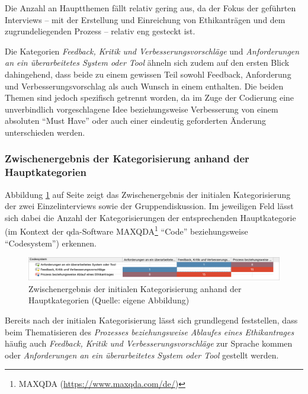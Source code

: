 \documentclass[a4paper,12pt,twoside]{scrreprt}
\begin{document}
Die Anzahl an Hauptthemen fällt relativ gering aus, da der Fokus der geführten Interviews -- mit der Erstellung und Einreichung von Ethikanträgen und dem zugrundeliegenden Prozess -- relativ eng gesteckt ist.

Die Kategorien \textit{Feedback, Kritik und Verbesserungsvorschläge} und \textit{Anforderungen an ein überarbeitetes System oder Tool} ähneln sich zudem auf den ersten Blick dahingehend, dass beide zu einem gewissen Teil sowohl Feedback, Anforderung und Verbesserungsvorschlag als auch Wunsch in einem enthalten. Die beiden Themen sind jedoch spezifisch getrennt worden, da im Zuge der Codierung eine unverbindlich vorgeschlagene Idee beziehungsweise Verbesserung von einem absoluten \enquote{Must Have} oder auch einer eindeutig geforderten Änderung unterschieden werden.

\subsubsection*{Zwischenergebnis der Kategorisierung anhand der Hauptkategorien}
\label{sub-sub-sec:zwischenstand-hauptkategorisisierung}

Abbildung \ref{fig:zwischenstand-hauptkategorisierung} auf Seite \pageref{fig:zwischenstand-hauptkategorisierung} zeigt das Zwischenergebnis der initialen Kategorisierung der zwei Einzelinterviews sowie der Gruppendiskussion. Im jeweiligen Feld lässt sich dabei die Anzahl der Kategorisierungen der entsprechenden Hauptkategorie (im Kontext der \ac{qda}-Software MAXQDA\footnote{MAXQDA (\url{https://www.maxqda.com/de/})} \enquote{Code} beziehungsweise \enquote{Codesystem}) erkennen.

\begin{figure}[ht]
    \centering
    \includegraphics[width=\linewidth]{thesis/images/Luidold_Hauptkategorien-Zwischenergebnis.png}
    \caption[Zwischenergebnis der initialen Kategorisierung anhand der Hauptkategorien]{Zwischenergebnis der initialen Kategorisierung anhand der Hauptkategorien (Quelle: eigene Abbildung)}
    \label{fig:zwischenstand-hauptkategorisierung}
\end{figure}

Bereits nach der initialen Kategorisierung lässt sich grundlegend feststellen, dass beim Thematisieren des \textit{Prozesses beziehungsweise Ablaufes eines Ethikantrages} häufig auch \textit{Feedback, Kritik und Verbesserungsvorschläge} zur Sprache kommen oder \textit{Anforderungen an ein überarbeitetes System oder Tool} gestellt werden.
\end{document}
